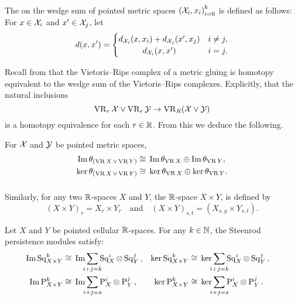 \subsubsection{}\label{ss:wedge sum}

The  on the wedge sum of pointed metric spaces ${(\mathcal{X}_i, x_i)}_{i = 0}^k$ is defined as follows: For $x \in \mathcal{X}_i$ and $x' \in \mathcal{X}_j$, let
\[
d(x, x') =
\begin{cases}
	d_{\cX_i}(x, x_i) + d_{\cX_j}(x', x_j) & i \neq j, \\
	\hfil d_{\cX_i}(x, x') & i = j.
\end{cases}
\]

Recall from \cite[Proposition 1]{adamaszek2020homotopy} that the Vietoris--Rips complex of a metric gluing is homotopy equivalent to the wedge sum of the Vietoris--Rips complexes.
Explicitly, that the natural inclusions
\[
\operatorname{VR}_r\mathcal{X} \vee \operatorname{VR}_r\mathcal{Y} \to \operatorname{VR}_R(\mathcal{X} \vee \mathcal{Y})
\]
is a homotopy equivalence for each $r \in \mathbb{R}$.
From this we deduce the following.

\medskip\corollary
For $\mathcal{X}$ and $\mathcal{Y}$ be pointed metric spaces,
\begin{align*}
	\operatorname{Im}\theta_{(\operatorname{VR} X \, \vee \, \operatorname{VR} Y)} &\cong \, \operatorname{Im}\theta_{\operatorname{VR} X} \oplus \operatorname{Im}\theta_{\operatorname{VR} Y}, \\
	\ker\theta_{(\operatorname{VR} X \, \vee \, \operatorname{VR} Y)} &\cong \, \ker\theta_{\operatorname{VR} X} \oplus \ker\theta_{\operatorname{VR} Y}.
\end{align*}

\subsubsection{}

Similarly, for any two $\mathbb{R}$-spaces $X$ and $Y$, the $\mathbb{R}$-space $X \times Y$, is defined by
\[
(X \times Y)_r = X_r \times Y_r \quad\text{and}\quad (X \times Y)_{s,t} = (X_{s,y} \times Y_{s,t}).
\]

\theorem
Let $X$ and $Y$ be pointed cellular $\mathbb{R}$-spaces.
For any $k \in \mathbb{N}$, the Steenrod persistence modules satisfy:
\begin{align*}
	\img\Sq^k_{X \times Y} &\cong\, \img\sum_{\mathclap{i+j=k}} \Sq^i_X \ot \Sq^j_Y\,, & \ker\Sq^k_{X \times Y} &\cong\, \ker\sum_{\mathclap{i+j=k}} \Sq^i_X \ot \Sq^j_Y\,, \\
	\img\rP^k_{X \times Y} &\cong\, \img\sum_{\mathclap{i+j=s}} \rP^i_X \otimes \rP^j_Y\,, & 
	\ker\rP^k_{X \times Y} &\cong\, \ker\sum_{\mathclap{i+j=s}} \rP^i_X \otimes \rP^j_Y\,. &
\end{align*}

